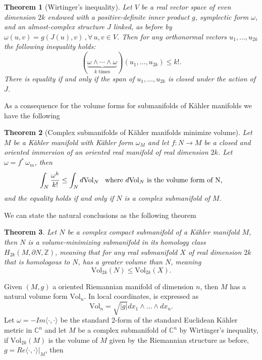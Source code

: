\documentclass[12pt,twoside,a4paper]{report}
\newtheorem{theorem}{Theorem}[section]
\newcommand{\zah}{\ensuremath{ \mathbb Z }}
\newcommand{\con}{\ensuremath{\mathbb{C}^n}}
\begin{document}
\begin{theorem}[Wirtinger's inequality]Let $V$  be a real vector space  of even dimension $2k$ endowed with a positive-definite inner product $g$, symplectic form $\omega$, and  an almost-complex structure $J$  linked, as before by $\omega(u, v) = g(J(u), v)\, ,\forall\,u,v\in{V}$. Then for any orthonormal vectors $u_1, \dots, u_{2k}$ the following inequality holds:
  \[
    (\underbrace {\omega \wedge \cdots \wedge \omega } _{k{\text{ times}}})(u_{1},\ldots ,u_{2k})\leq k!.
  \]
There is equality if and only if the span of $u_1,\dots, u_{2k}$ is closed under the action of $J$.
\end{theorem}
As a consequence for the volume forms for submanifolds of K\"ahler manifolds we have the following
\begin{theorem}[Complex submanifolds of Kähler manifolds minimize volume]
Let $M$ be a K\"ahler manifold with K\"ahler form $\omega_M$ and let $f:N\rightarrow M$ be a closed and oriented immersion
of an oriented real manifold of real dimension $2k$. Let $\omega=f^*\,\omega_m$, then
\begin{equation}
            \int_{N} \frac{\omega^k}{k!}\leq \int_N d\textrm{Vol}_N\hspace{0.3cm}\text{where }d\textrm{Vol}_N\text{ is the volume form of N,}
\end{equation}
and the equality holds if and only if $N$ is a complex submanifold of $M$.
\end{theorem}
We can state the natural conclusions as the following theorem
\begin{theorem}\label{wirtinger}
        Let $N$ be a complex compact submanifold of a K\"ahler manifold $M$, then $N$ is a volume-minimizing submanifold in its homology class $H_{2k}(M,\partial N,\zah)$, meaning that for any real submanifold $X$ of real dimension $2k$ that is homologous to $N$, has a greater volume than $N$, meaning
        \[
          \mathrm{Vol}_{2k}(N)\leq \mathrm{Vol}_{2k}(X).
        \]
\end{theorem}
Given $(M,g)$ a oriented Riemannian manifold of dimension $n$, then $M$ has a natural volume form $\textrm{Vol}_{n}$. In local coordinates, is expressed as
\[
 \textrm{Vol}_{n}=\sqrt{|g|}dx_{1}\wedge\dots\wedge dx_{n}.
\]
Let $\omega=-Im\langle\cdot,\cdot\rangle$ be the standard 2-form of the standard Euclidean K\"ahler metric in $\con$ and let $M$ be a complex submanifold of $\con$ by Wirtinger's inequality, if $\textrm{Vol}_{2k}(M)$ is the volume of $M$ given by the Riemannian structure as before, $g=Re\langle\cdot,\cdot\rangle\vert_{M}$, then
\end{document}
